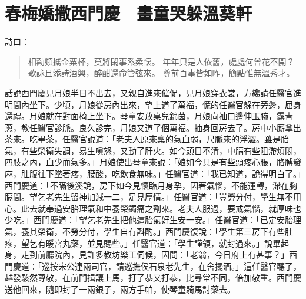 
\chapter{春梅嬌撒西門慶　畫童哭躲溫葵軒}

詩曰：
\begin{quote}
相勸頻攜金粟杯，莫將閑事系柔懷。
年年只是人依舊，處處何曾花不開？
歌詠且添詩酒興，醉酣還命管弦來。
尊前百事皆如昨，簡點惟無溫秀才。
\end{quote}

話說西門慶見月娘半日不出去，又親自進來催促，見月娘穿衣裳，方纔請任醫官進明間內坐下。少頃，月娘從房內出來，望上道了萬福，慌的任醫官躲在旁邊，屈身還禮。月娘就在對面椅上坐下。琴童安放桌兒錦茵，月娘向袖口邊伸玉腕，露青蔥，教任醫官診脈。良久診完，月娘又道了個萬福。抽身回房去了。房中小廝拿出茶來。吃畢茶，任醫官說道：「老夫人原來稟的氣血弱，尺脈來的浮澀。雖是胎氣，有些榮衛失調，易生嗔怒，又動了肝火。如今頭目不清，中膈有些阻滯煩悶，四肢之內，血少而氣多。」月娘使出琴童來說：「娘如今只是有些頭疼心脹，胳膊發麻，肚腹往下墜著疼，腰酸，吃飲食無味。」任醫官道：「我已知道，說得明白了。」西門慶道：「不瞞後溪說，房下如今見懷臨月身孕，因著氣惱，不能運轉，滯在胸膈間。望乞老先生留神加減一二，足見厚情。」任醫官道：「豈勞分付，學生無不用心。此去就奉過安胎理氣和中養榮蠲痛之劑來。老夫人服過，要戒氣惱，就厚味也少吃。」西門慶道：「望乞老先生把他這胎氣好生安一安。」任醫官道：「已定安胎理氣，養其榮衛，不勞分付，學生自有斟酌。」西門慶復說：「學生第三房下有些肚疼，望乞有暖宮丸藥，並見賜些。」任醫官道：「學生謹領，就封過來。」說畢起身，走到前廳院內，見許多教坊樂工伺候，因問：「老翁，今日府上有甚事？」西門慶道：「巡按宋公連兩司官，請巡撫侯石泉老先生，在舍擺酒。」這任醫官聽了，越發駭然尊敬，在前門揖讓上馬，打了恭又打恭，比尋常不同，倍加敬重。西門慶送他回來，隨即封了一兩銀子，兩方手帕，使琴童騎馬討藥去。

